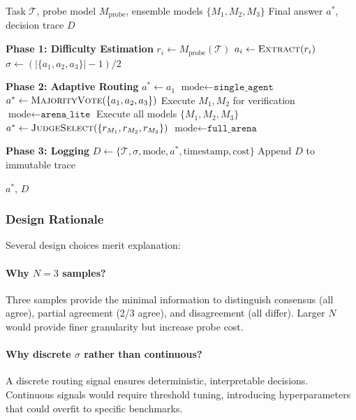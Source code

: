\documentclass{article}
\newcommand{\acar}{\textsc{ACAR}}
\begin{document}
\begin{algorithm}[t]
\caption{\acar{} Routing Procedure}
\label{alg:acar}
\begin{algorithmic}[1]
\REQUIRE Task $\mathcal{T}$, probe model $M_{\text{probe}}$, ensemble models $\{M_1, M_2, M_3\}$
\ENSURE Final answer $a^*$, decision trace $D$

\STATE \textbf{Phase 1: Difficulty Estimation}
    \STATE $r_i \gets M_{\text{probe}}(\mathcal{T})$ 
    \STATE $a_i \gets \textsc{Extract}(r_i)$ 
\ENDFOR
\STATE $\sigma \gets (|\{a_1, a_2, a_3\}| - 1) / 2$ 

\STATE \textbf{Phase 2: Adaptive Routing}
    \STATE $a^* \gets a_1$ 
    \STATE $\text{mode} \gets \texttt{single\_agent}$
    \STATE $a^* \gets \textsc{MajorityVote}(\{a_1, a_2, a_3\})$
    \STATE Execute $M_1, M_2$ for verification
    \STATE $\text{mode} \gets \texttt{arena\_lite}$
\ELSE
    \STATE Execute all models $\{M_1, M_2, M_3\}$
    \STATE $a^* \gets \textsc{JudgeSelect}(\{r_{M_1}, r_{M_2}, r_{M_3}\})$
    \STATE $\text{mode} \gets \texttt{full\_arena}$
\ENDIF

\STATE \textbf{Phase 3: Logging}
\STATE $D \gets \{\mathcal{T}, \sigma, \text{mode}, a^*, \text{timestamp}, \text{cost}\}$
\STATE Append $D$ to immutable trace

\RETURN $a^*$, $D$
\end{algorithmic}
\end{algorithm}

\subsubsection{Design Rationale}

Several design choices merit explanation:

\paragraph{Why $N=3$ samples?} Three samples provide the minimal information to distinguish consensus (all agree), partial agreement (2/3 agree), and disagreement (all differ). Larger $N$ would provide finer granularity but increase probe cost.

\paragraph{Why discrete $\sigma$ rather than continuous?} A discrete routing signal ensures deterministic, interpretable decisions. Continuous signals would require threshold tuning, introducing hyperparameters that could overfit to specific benchmarks.
\end{document}
